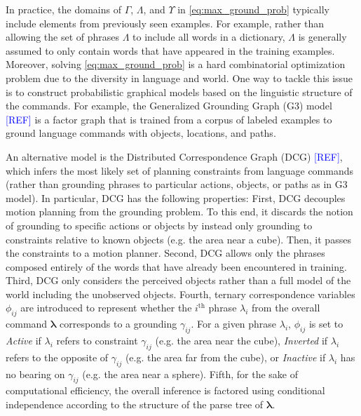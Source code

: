 In practice, the domains of $\Gamma$, $\Lambda$, and $\Upsilon$ in \eqref{eq:max_ground_prob} typically include elements from previously seen examples. %
For example, rather than allowing the set of phrases $\Lambda$ to include all words in a dictionary, $\Lambda$ is generally assumed to only contain words that have appeared in the training examples. Moreover, solving \eqref{eq:max_ground_prob} is a hard combinatorial optimization problem due to the diversity in language and world.
One way to tackle this issue is to construct probabilistic graphical models based on the linguistic structure of the commands. For example, the Generalized Grounding Graph (G3) model \textcolor{blue}{[REF]} is a factor graph that is trained from a corpus of labeled examples to ground language commands with objects, locations, and paths.  

An alternative model is the Distributed Correspondence Graph (DCG) \textcolor{blue}{[REF]}, which infers the most likely set of planning constraints from language commands (rather than grounding phrases to particular actions, objects, or paths as in G3 model). In particular, DCG has the following properties:  
First, DCG decouples motion planning from the grounding problem. To this end, it discards the notion of grounding to specific actions or objects by instead only grounding to constraints relative to known objects (e.g. the area near a cube). Then, it passes the constraints to a motion planner.
Second, DCG allows only the phrases composed entirely of the words that have already been encountered in training.
Third, DCG only considers the perceived objects rather than a full model of the world including the unobserved objects.
Fourth, ternary correspondence variables $\phi_{ij}$ are introduced to represent whether the $i^\text{th}$ phrase $\lambda_i$ from the overall command $\boldsymbol{\lambda}$ corresponds to a grounding $\gamma_{ij}$.
For a given phrase $\lambda_i$, $\phi_{ij}$ is set to \emph{Active} if $\lambda_i$ refers to constraint $\gamma_{ij}$ (e.g. the area near the cube), \emph{Inverted} if $\lambda_i$ refers to the opposite of $\gamma_{ij}$ (e.g. the area far from the cube), or \emph{Inactive} if $\lambda_i$ has no bearing on $\gamma_{ij}$ (e.g. the area near a sphere).
Fifth, for the sake of computational efficiency, the overall inference is factored using conditional independence according to the structure of the parse tree of $\boldsymbol{\lambda}$.

